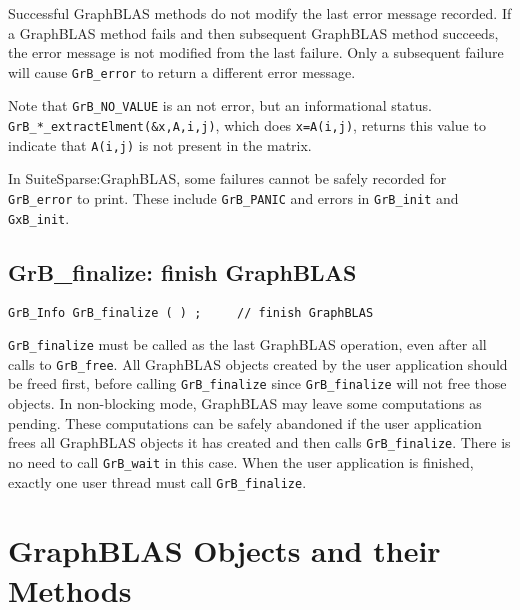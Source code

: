 \documentclass[12pt]{article}
\begin{document}
Successful GraphBLAS methods do not modify the last error message recorded.  If
a GraphBLAS method fails and then subsequent GraphBLAS method succeeds, the
error message is not modified from the last failure.  Only a subsequent failure
will cause \verb'GrB_error' to return a different error message.

Note that \verb'GrB_NO_VALUE' is an not error, but an informational status.
\verb'GrB_*_extractElment(&x,A,i,j)', which does \verb'x=A(i,j)', returns this
value to indicate that \verb'A(i,j)' is not present in the matrix.

In SuiteSparse:GraphBLAS, some failures cannot be safely recorded for
\verb'GrB_error' to print.  These include \verb'GrB_PANIC' and errors in
\verb'GrB_init' and \verb'GxB_init'.

\newpage
\subsection{{\sf GrB\_finalize:} finish GraphBLAS} %
\label{finalize}

\begin{mdframed}[userdefinedwidth=6in]
{\footnotesize
\begin{verbatim}
GrB_Info GrB_finalize ( ) ;     // finish GraphBLAS
\end{verbatim}
}\end{mdframed}

\verb'GrB_finalize' must be called as the last GraphBLAS operation, even after
all calls to \verb'GrB_free'.  All GraphBLAS objects created by the user
application should be freed first, before calling \verb'GrB_finalize' since
\verb'GrB_finalize' will not free those objects.  In non-blocking mode,
GraphBLAS may leave some computations as pending.  These computations can be
safely abandoned if the user application frees all GraphBLAS objects it has
created and then calls \verb'GrB_finalize'.  There is no need to call
\verb'GrB_wait' in this case.  When the user application is finished, exactly
one user thread must call \verb'GrB_finalize'.

\newpage
\section{GraphBLAS Objects and their Methods} %
\label{objects}
\end{document}
